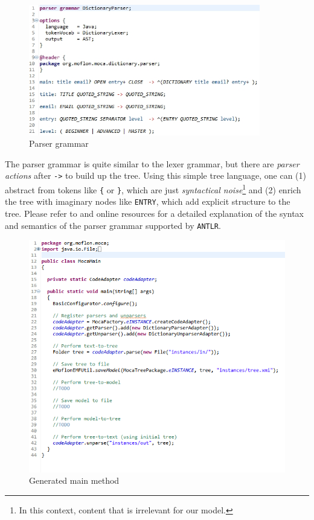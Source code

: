 \begin{figure}[!htbp]
\begin{center}
 \includegraphics[width=0.9\textwidth]{pics/moca/2TextToMocaTree/7-parser}
  \caption{Parser grammar}
  \label{fig:moca-7-parser}
\end{center}
\end{figure}
The parser grammar is quite similar to the lexer grammar, but there are \emph{parser actions} after \texttt{->} to build up the tree.
Using this simple tree language, one can (1) abstract from tokens like \texttt{\{} or \texttt{\}}, which are just \emph{syntactical noise}\footnote{In this context, content that is irrelevant for our model.} and (2) enrich the tree with imaginary nodes like \texttt{ENTRY}, which add explicit structure to the tree.
Please refer to \cite{ANTLR} and online resources for a detailed explanation of the syntax and semantics of the parser grammar supported by \texttt{ANTLR}. 
 
\begin{figure}[htp]
\begin{center}
 \includegraphics[width=\textwidth]{pics/moca/2TextToMocaTree/8-MocaMain}
  \caption{Generated main method}
  \label{fig:moca-8-MocaMain} 
\end{center}
\end{figure}

